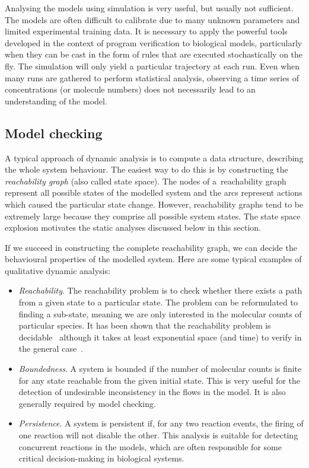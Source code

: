 \documentclass[11pt,a4paper]{report}
\begin{document}
Analysing the models using simulation is very useful, but usually not sufficient. The models are often difficult to calibrate due to many unknown parameters and limited experimental training data. It is necessary to apply the powerful tools developed in the context of program verification to biological models, particularly when
they can be cast in the form of rules that are executed stochastically on the fly. The simulation will only yield a particular trajectory at each run. Even when many runs are gathered to perform statistical analysis, observing a time series of concentrations (or molecule numbers) does not necessarily lead to an understanding of the model.

\subsection{Model checking}

A typical approach of dynamic analysis is to compute a data structure, describing the whole system behaviour. The easiest way to do this is by constructing the \emph{reachability graph} (also called state space). The nodes of a~reachability graph represent all possible states of the modelled system and the arcs represent actions which caused the particular state change. However, reachability graphs tend to be extremely large because they comprise all possible system states. The state space explosion motivates the static analyses discussed below in this section. 

If we succeed in constructing the complete reachability graph, we can decide the behavioural properties of the modelled system. Here are some typical examples of qualitative dynamic analysis:

\begin{itemize}
	\item \emph{Reachability}. The reachability problem is to check whether there exists a path from a given state to a particular state. The problem can be reformulated to finding a sub-state, meaning we are only interested in the molecular counts of particular species. It has been shown that the reachability problem is decidable~\cite{kosaraju1982decidability} although it takes at least exponential space (and time) to verify in the general case~\cite{lipton1976reachability}.
	\item \emph{Boundedness}. A system is bounded if the number of molecular counts is finite for any state reachable from the given initial state. This is very useful for the detection of undesirable inconsistency in the flows in the model. It is also generally required by model checking.
	\item \emph{Persistence}. A system is persistent if, for any two reaction events, the firing of one reaction will not disable the other. This analysis is suitable for detecting concurrent reactions in the models, which are often responsible for some critical decision-making in biological systems.
\end{itemize}
\end{document}

